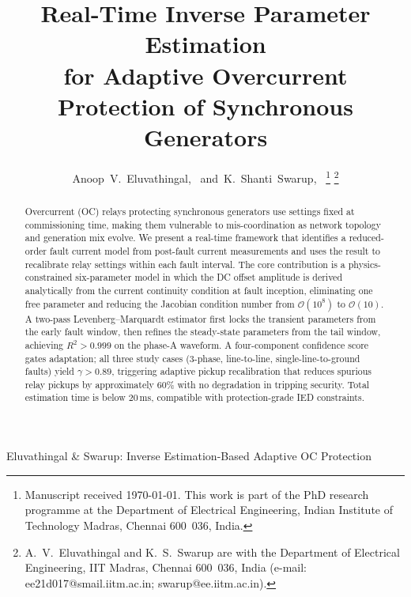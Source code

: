 \documentclass[journal, twoside, 10pt]{IEEEtran}
\begin{document}

\title{Real-Time Inverse Parameter Estimation\\for Adaptive Overcurrent
       Protection of Synchronous Generators}

\author{Anoop~V.~Eluvathingal,~
        and~K.~Shanti~Swarup,~%
\thanks{Manuscript received \today.
        This work is part of the PhD research programme at the Department of
        Electrical Engineering, Indian Institute of Technology Madras,
        Chennai 600~036, India.}%
\thanks{A.~V.~Eluvathingal and K.~S.~Swarup are with the Department of
        Electrical Engineering, IIT Madras, Chennai 600~036, India
        (e-mail: ee21d017@smail.iitm.ac.in; swarup@ee.iitm.ac.in).}}

%
{Eluvathingal \& Swarup: Inverse Estimation-Based Adaptive OC Protection}

\maketitle

\begin{abstract}
Overcurrent (OC) relays protecting synchronous generators use settings fixed at
commissioning time, making them vulnerable to mis-coordination as network
topology and generation mix evolve.
We present a real-time framework that identifies a reduced-order fault current
model from post-fault current measurements and uses the result to recalibrate
relay settings within each fault interval.
The core contribution is a physics-constrained six-parameter model in which the
DC offset amplitude is derived analytically from the current continuity
condition at fault inception, eliminating one free parameter and reducing the
Jacobian condition number from $\mathcal{O}(10^8)$ to $\mathcal{O}(10)$.
A two-pass Levenberg--Marquardt estimator first locks the transient parameters
from the early fault window, then refines the steady-state parameters from the
tail window, achieving $R^2 > 0.999$ on the phase-A waveform.
A four-component confidence score gates adaptation; all three study cases
(3-phase, line-to-line, single-line-to-ground faults) yield $\gamma > 0.89$,
triggering adaptive pickup recalibration that reduces spurious relay pickups by
approximately $60\%$ with no degradation in tripping security.
Total estimation time is below $20\,\text{ms}$, compatible with
protection-grade IED constraints.
\end{abstract}
\end{document}

